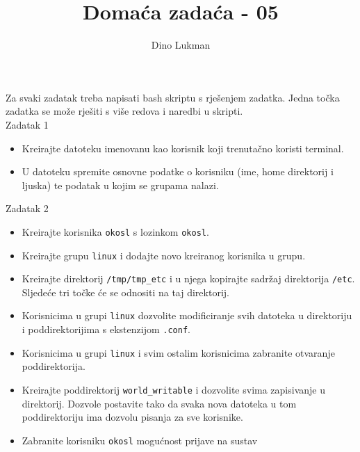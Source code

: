 \documentclass[12pt,a4paper]{article}
\newcommand{\shell}[1]{\texttt{#1}}
\begin{document}
	\title{Domaća zadaća - 05}
	\author{Dino Lukman}
	\maketitle
	Za svaki zadatak treba napisati bash skriptu s rješenjem zadatka. Jedna točka zadatka se može rješiti s više redova i naredbi u skripti. \\

	Zadatak 1
   	\begin{itemize}
			\item Kreirajte datoteku imenovanu kao korisnik koji trenutačno koristi terminal. 
      \item U datoteku spremite osnovne podatke o korisniku (ime, home direktorij i ljuska) te podatak u kojim se grupama nalazi.
		\end{itemize}
	Zadatak 2
		\begin{itemize}
			\item Kreirajte korisnika \shell{okosl} s lozinkom \shell{okosl}.
			\item Kreirajte grupu \shell{linux} i dodajte novo kreiranog korisnika u grupu.
			\item Kreirajte direktorij \shell{/tmp/tmp\_etc} i u njega kopirajte sadržaj direktorija \shell{/etc}. Sljedeće tri točke će se odnositi na taj direktorij.
			\item Korisnicima u grupi \shell{linux} dozvolite modificiranje svih datoteka u direktoriju i poddirektorijima s ekstenzijom \shell{.conf}.
      \item Korisnicima u grupi \shell{linux} i svim ostalim korisnicima zabranite otvaranje poddirektorija.
      \item Kreirajte poddirektorij \shell{world\_writable} i dozvolite svima zapisivanje u direktorij. Dozvole postavite tako da svaka nova datoteka u tom poddirektoriju ima dozvolu pisanja za sve korisnike.
      \item Zabranite korisniku \shell{okosl} mogućnost prijave na sustav
		\end{itemize}
\end{document}
